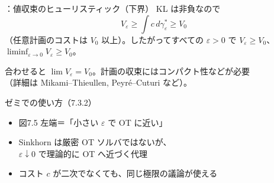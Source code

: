 \assuppl
\begin{frame}{\supplmark：値収束のヒューリスティック（下界）}
    KL は非負なので
    \[
        V_\varepsilon
        \ge
        \int c\,d\gamma_\varepsilon^*
        \ge
        V_0
    \]
    （任意計画のコストは $V_0$ 以上）。したがってすべての $\varepsilon>0$ で $V_\varepsilon\ge V_0$、\\
    $\liminf_{\varepsilon\to 0} V_\varepsilon\ge V_0$。
    \begin{alertblock}{合わせると}
        $\lim V_\varepsilon=V_0$。計画の収束にはコンパクト性などが必要\\
        （詳細は Mikami--Thieullen, Peyré--Cuturi など）。
    \end{alertblock}
\end{frame}
\asmain
\begin{frame}{ゼミでの使い方（7.3.2）}
    \begin{itemize}
        \item 図7.5 左端＝「小さい $\varepsilon$ で OT に近い」
        \item Sinkhorn は厳密 OT ソルバではないが、\\
        $\varepsilon\downarrow 0$ で理論的に OT へ近づく代理
        \item コスト $c$ が二次でなくても、同じ極限の議論が使える
    \end{itemize}
\end{frame}
